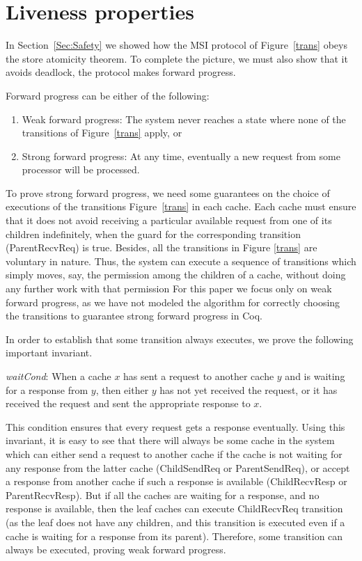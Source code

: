\section{Liveness properties}
\label{Sec:Liveness}

In Section~\ref{Sec:Safety} we showed how the MSI protocol of Figure~\ref{trans}
obeys the store atomicity theorem. To complete the picture, we must also show
that it avoids deadlock, \ie{} the protocol makes forward progress.

Forward progress can be either of the following:
\begin{enumerate}
\item Weak forward progress: The system never reaches a state where
  none of the transitions of Figure~\ref{trans} apply, or
\item Strong forward progress: At any time, eventually a new request
  from some processor will be processed.
\end{enumerate}

To prove strong forward progress, we need some guarantees on the choice of
executions of the transitions Figure~\ref{trans} in each cache. Each cache must
ensure that it does not avoid receiving a particular available request from one
of its children indefinitely, when the guard for the corresponding transition
(ParentRecvReq) is true. Besides, all the transitions in Figure \ref{trans} are
voluntary in nature. Thus, the system can execute a sequence of transitions
which simply moves, say, the \Mo{} permission among the children of a cache,
without doing any further work with that permission
For this paper we focus only on weak forward progress, as we have not modeled
the algorithm for correctly choosing the transitions to guarantee strong
forward progress in Coq.

In order to establish that some transition always executes, we prove the
following important invariant.

\begin{inv}
\textit{waitCond}: When a cache $x$ has sent a request to another cache $y$ and
is waiting for a response from $y$, then either $y$ has not yet received the
request, or it has received the request and sent the appropriate response to
$x$.
\end{inv}

This condition ensures that every request gets a response eventually. Using
this invariant, it is easy to see that there will always be some cache in the
system which can either send a request to another cache if the cache is not
waiting for any response from the latter cache (ChildSendReq or ParentSendReq),
or accept a response from another cache if such a response is available
(ChildRecvResp or ParentRecvResp). But if all the caches are waiting for a
response, and no response is available, then the leaf caches can execute
ChildRecvReq transition (as the leaf does not have any children, and this
transition is executed even if a cache is waiting for a response from its
parent). Therefore, some transition can always be executed, proving weak
forward progress.
